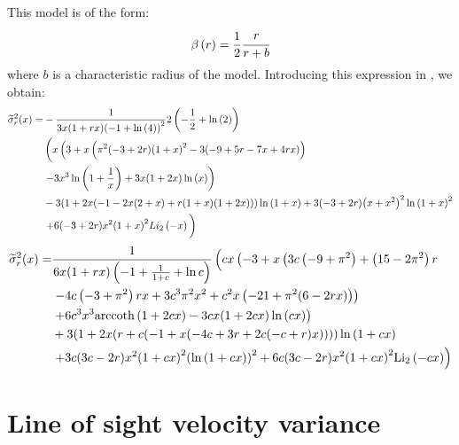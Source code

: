This model is of the form:
%
\begin{equation}
    \beta \left(r\right) = \frac{1}{2}\cfrac{r}{r+b}
\end{equation}
%
where $b$ is a characteristic radius of the model. Introducing this expression
in , we obtain:
%
\begin{align}
    \widetilde\sigma_r^2(x)=&
        -\frac{1}{3 x (1+r x)
        {(-1+\ln\left(4\right))}^2}2
        \left(-\frac{1}{2}+\ln\left(2\right)\right)\nonumber\\
    &\left(x \left(3+x \left(\pi ^2 (-3+2 r)
        {(1+x)}^2-3 (-9+5 r-7 x+4 r x)
        \right)\right.\vphantom{\ln\left(1+\frac{1}{x}\right)}\right.
        \nonumber\\
    &\left.-3 x^3 \ln\left(1+\frac{1}{x}\right)+3 x (1+2 x)
        \ln\left(x\right)\right)\nonumber\\
    & -3 (1+2 x (-1-2 x (2+x)+r (1+x) (1+2 x)))
        \ln\left(1+x\right)+3 (-3+2 r) {\left(x+x^2\right)}^2
        \ln{\left(1+x\right)}^2\nonumber\\
    & \left.+6 (-3+2 r) x^2 {(1+x)}^2
        Li_2\left(-x\right)\vphantom{\ln\left(1+\frac{1}{x}\right)}\right)
        \nonumber\\
\end{align}
\begin{align}
    \widetilde\sigma_r^2(x)=&
        \frac{1}{6 x (1+r x) \left(-1+\frac{1}{1+c}+\ln c\right)}
        \left(c x \left(-3+x \left(3 c \left(-9+\pi ^2\right)+
        \left(15-2 \pi ^2\right) r\right.\right.
        \vphantom{{(1+c x)}^2}\right.\\
    &\left. -4 c \left(-3+\pi ^2\right) r x+
        3 c^3 \pi ^2 x^2+c^2 x \left(-21+\pi ^2 (6-2 r x)\right)\right)\\
    & \left.+6 c^3 x^3 {\rm arccoth} \left(1+2 c x\right)-
        3 c x (1+2 c x) \ln\left(c x\right)\right)\\
    &+3(1+2 x (r+c (-1+x (-4 c+3 r+2 c (-c+r) x))))
        \ln\left(1+c x\right)\\
    &\left.+3c(3 c-2 r) x^2 {(1+c x)}^2 {\left(\ln\left(1+c x\right)\right)}^2+
    6 c (3 c-2 r) x^2 {(1+c x)}^2 \mathrm{Li_2}\left(-c x\right)\right)\\
\end{align}

\section{Line of sight velocity variance}


